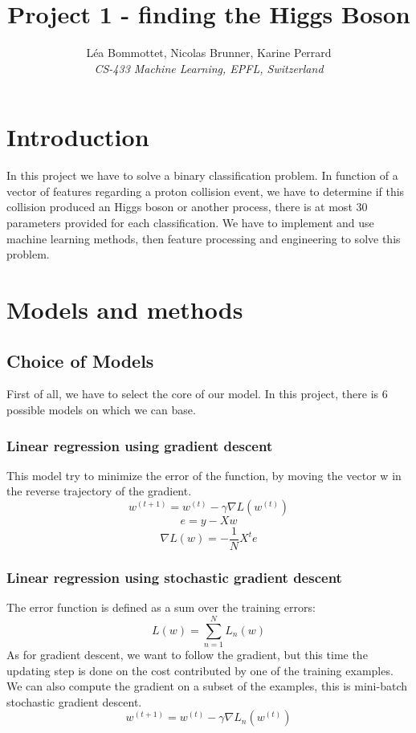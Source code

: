 \documentclass[10pt,conference,compsocconf]{IEEEtran}
\begin{document}
\title{Project 1 - finding the Higgs Boson}

\author{
  L\'ea Bommottet, Nicolas Brunner, Karine Perrard\\
  \textit{CS-433 Machine Learning, EPFL, Switzerland}
}

\maketitle

\section{Introduction}

In this project we have to solve a binary classification problem. In function of a vector of features regarding a proton collision event, we have to determine if this collision produced an Higgs boson or another process,
there is at most 30 parameters provided for each classification. We have to implement and use machine learning methods, then feature processing and engineering to solve this problem.

\section{Models and methods}

\subsection{Choice of Models}
First of all, we have to select the core of our model. In this project, there is 6 possible models on which we can base.
\subsubsection{Linear regression using gradient descent}
	
	This model try to minimize the error of the function, by moving the vector w in the reverse trajectory of the gradient.
	$$w^{(t+1)}=w^{(t)} -\gamma \nabla L(w^{(t)})$$
	$$e = y-Xw$$
	$$\nabla L(w) = -\frac{1}{N}X^te$$
	
\subsubsection{Linear regression using stochastic gradient descent}
	
	The error function is defined as a sum over the training errors: \\
    $$ L(w) = \sum\limits_{n=1}^N L_n(w)$$
    As for gradient descent, we want to follow the gradient, but this time the updating step is done on the cost contributed by one of the training examples. We can also compute the gradient on a subset of the examples, this is mini-batch stochastic gradient descent.
    $$w^{(t+1)}=w^{(t)} -\gamma \nabla L_n(w^{(t)})$$
	
\end{document}
